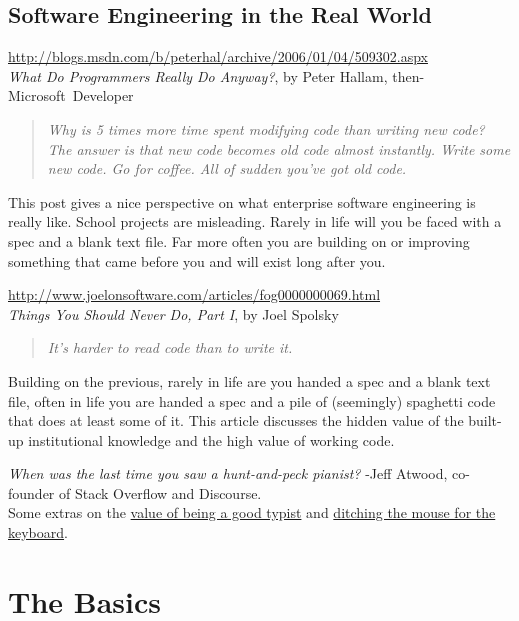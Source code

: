 \documentclass{article}
\begin{document}
{\subsection*{Software Engineering in the Real World}
\url{http://blogs.msdn.com/b/peterhal/archive/2006/01/04/509302.aspx}\\
\emph{What Do Programmers Really Do Anyway?}, by Peter Hallam, then-Microsoft~Developer
\begin{quote}
  \emph{%
    Why is 5 times more time spent modifying code than writing new code? The
    answer is that new code becomes old code almost instantly.  Write some new
    code. Go for coffee. All of sudden you've got old code.
  }
\end{quote}
This post gives a nice perspective on what enterprise software engineering is
really like. School projects are misleading. Rarely in life will you be faced
with a spec and a blank text file. Far more often you are building on or
improving something that came before you and will exist long after you.

\medskip
\noindent
\url{http://www.joelonsoftware.com/articles/fog0000000069.html}\\
\emph{Things You Should Never Do, Part I}, by Joel Spolsky
\begin{quote}
  \emph{It's harder to read code than to write it.}
\end{quote}
Building on the previous, rarely in life are you handed a spec and a blank text
file, often in life you are handed a spec and a pile of (seemingly) spaghetti
code that does at least some of it. This article discusses the hidden value of
the built-up institutional knowledge and the high value of working code.

\medskip
\noindent
\emph{When was the last time you saw a hunt-and-peck pianist?} -Jeff Atwood,
co-founder of Stack Overflow and Discourse.\\
Some extras on the
\href{http://blog.codinghorror.com/we-are-typists-first-programmers-second/}
{value of being a good typist}
and
\href{http://blog.codinghorror.com/going-commando-put-down-the-mouse/}
{ditching the mouse for the keyboard}.

}



\newpage
\section{The Basics}
\end{document}
